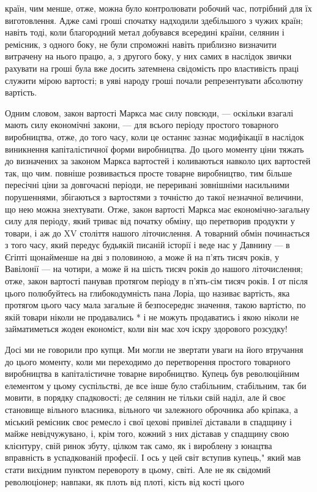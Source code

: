 \parcont{}  %
країн, чим менше, отже, можна було контролювати робочий час, потрібний для їх виготовлення. Адже самі гроші спочатку
надходили здебільшого з чужих країн; навіть тоді, коли благородний метал добувався всередині країни, селянин і ремісник, з
одного боку, не були спроможні навіть приблизно визначити витрачену на нього працю, а, з другого боку, у них самих в
наслідок звички рахувати на гроші була вже досить затемнена свідомість про властивість праці служити мірою вартості;  в уяві
народу гроші почали репрезентувати абсолютну вартість.

Одним словом, закон вартості Маркса має силу повсюди, —  оскільки
взагалі мають силу економічні закони, — для всього періоду простого товарного виробництва, отже, до того часу, коли це
останнє зазнає модифікації в наслідок виникнення капіталістичної форми виробництва. До цього моменту ціни тяжать до
визначених за законом Маркса вартостей і коливаються навколо цих вартостей так, що чим. повніше розвивається просте товарне
виробництво, тим більше пересічні ціни за довгочасні періоди, не переривані зовнішніми насильними порушеннями, збігаються з
вартостями з точністю до такої незначної величини, що нею можна знехтувати. Отже, закон вартості Маркса має
економічно-загальну силу для періоду, який триває від початку обміну, що перетворив продукти у товари, і аж до XV століття
нашого літочислення. А товарний обмін починається з того часу, який передує будьякій писаній історії і веде нас у Давнину —
в Єгіпті щонайменше на дві з половиною, а може й на п’ять тисяч років, у Вавілонії — на чотири, а може й на шість тисяч
років до нашого літочислення; отже, закон вартості панував протягом періоду в п’ять-сім тисяч років. І от після цього
полюбуйтесь на глибокодумність пана Лоріа, що називає вартість, яка протягом цього часу мала загальне й безпосереднє
значення, такою вартістю, по якій товари ніколи не продавались *  і не можуть продаватись і якою ніколи не займатиметься
жоден
економіст, коли він має хоч іскру здорового розсудку!

Досі ми не говорили про купця. Ми могли не звертати уваги на його
втручання до цього моменту, коли ми переходимо до перетворення простого товарного виробництва в капіталістичне товарне
виробництво. Купець був революційним елементом у цьому суспільстві, де все інше було стабільним, стабільним, так би мовити,
в порядку спадковості; де селянин не тільки свій наділ, але й своє становище вільного власника, вільного чи залежного
оброчника або кріпака, а міський ремісник своє ремесло і свої цехові привілеї діставали в спадщину і майже невідчужувано, і,
крім того, кожний з них діставав у спадщину свою клієнтуру, свій ринок збуту, цілком так само, як і вироблену з юнацтва
вправність в успадкованій професії. І ось у цей світ вступив купець," який мав стати вихідним пунктом перевороту в цьому,
світі. Але не як свідомий революціонер; навпаки, як плоть від плоті, кість від кості цього
\parbreak{}  %
